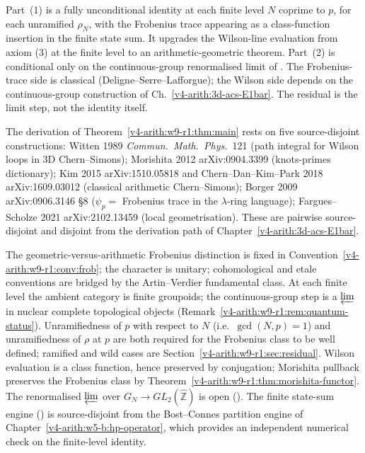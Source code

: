 \begin{remark}
\label{v4-arith:w9-r1:rem:scope}
Part~(1) is a fully unconditional identity at each finite level \(N\)
coprime to \(p\), for each unramified \(\rho_{N}\), with the
Frobenius trace appearing as a class-function insertion in the
finite state sum. It upgrades the Wilson-line evaluation from axiom
(3) at the finite level to an
arithmetic-geometric theorem. Part~(2) is conditional only on the
continuous-group renormalised limit of
. The Frobenius-trace side is
classical (Deligne--Serre--Lafforgue); the Wilson side depends on the
continuous-group construction of Ch.~\ref{v4-arith:3d-acs-E1bar}.
The residual is the limit step, not the identity itself.
\end{remark}

\begin{remark}
\label{v4-arith:w9-r1:rem:main-sources}
The derivation of Theorem~\ref{v4-arith:w9-r1:thm:main} rests on
five source-disjoint constructions: Witten 1989
\emph{Commun.\ Math.\ Phys.}~121 (path integral for Wilson loops in 3D
Chern--Simons); Morishita 2012 arXiv:0904.3399 (knots-primes dictionary);
Kim 2015 arXiv:1510.05818 and Chern--Dan--Kim--Park 2018
arXiv:1609.03012 (classical arithmetic Chern--Simons); Borger 2009
arXiv:0906.3146 \S8 (\(\psi_{p} =\) Frobenius trace in the
\(\lambda\)-ring language); Fargues--Scholze 2021 arXiv:2102.13459
(local geometrisation). These are pairwise source-disjoint and disjoint
from the derivation path of Chapter~\ref{v4-arith:3d-acs-E1bar}.

The geometric-versus-arithmetic Frobenius distinction is fixed in
Convention~\ref{v4-arith:w9-r1:conv:frob}; the character is unitary;
cohomological and etale conventions are bridged by the Artin--Verdier
fundamental class.
At each finite level the ambient category is finite groupoids; the
continuous-group step is a \(\varprojlim\) in nuclear complete topological
objects (Remark~\ref{v4-arith:w9-r1:rem:quantum-status}).
Unramifiedness of \(p\) with respect to \(N\) (i.e.\ \(\gcd(N,p)=1\))
and unramifiedness of \(\rho\) at \(p\) are both required for the
Frobenius class to be well defined; ramified and wild cases are
Section~\ref{v4-arith:w9-r1:sec:residual}.
Wilson evaluation is a class function, hence preserved by conjugation;
Morishita pullback preserves the Frobenius class by
Theorem~\ref{v4-arith:w9-r1:thm:morishita-functor}.
The renormalised \(\varprojlim\) over \(G_{N}\to GL_{2}(\widehat{\mathbb Z})\)
is open ().
The finite state-sum engine ()
is source-disjoint from the Bost--Connes partition engine of
Chapter~\ref{v4-arith:w5-b:hp-operator}, which provides an independent
numerical check on the finite-level identity.
\end{remark}

